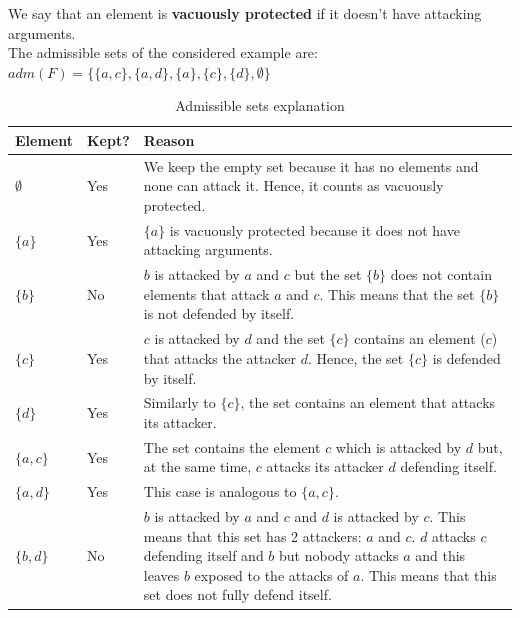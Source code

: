 \documentclass{scrbook}
\begin{document}
We say that an element is \textbf{vacuously protected} if it doesn't have attacking arguments. \\

The admissible sets of the considered example are: \\

$adm(F) = \{\{a,c\},\{a,d\},\{a\},\{c\},\{d\},\emptyset\}$ \\

\begin{table}
    \begin{tabularx}{\linewidth}{|p{5em}|p{4em}|X|} \hline
         \textbf{Element} & \textbf{Kept?} & \textbf{Reason} \\ \hline

        $\emptyset$ & Yes &
        We keep the empty set because it has no elements and none can attack it. Hence, it counts as vacuously protected. \\ \hline

        $\{a\}$ & Yes &
        $\{a\}$ is vacuously protected because it does not have attacking arguments. \\ \hline

        $\{b\}$ & No &
        $b$ is attacked by $a$ and $c$ but the set $\{b\}$ does not contain elements that attack $a$ and $c$. This means that the set $\{b\}$ is not defended by itself.\\ \hline

        $\{c\}$ & Yes &
        $c$ is attacked by $d$ and the set $\{c\}$ contains an element ($c$) that attacks the attacker $d$. Hence, the set $\{c\}$ is defended by itself.\\ \hline

        $\{d\}$ & Yes &
        Similarly to $\{c\}$, the set contains an element that attacks its attacker. \\ \hline

        $\{a,c\}$ & Yes &
        The set contains the element $c$ which is attacked by $d$ but, at the same time, $c$ attacks its attacker $d$ defending itself. \\ \hline

        $\{a,d\}$ & Yes &
        This case is analogous to $\{a,c\}$.\\ \hline

        $\{b,d\}$ & No &
        $b$ is attacked by $a$ and $c$ and $d$ is attacked by $c$. This means that this set has 2 attackers: $a$ and $c$. $d$ attacks $c$ defending itself and $b$ but nobody attacks $a$ and this leaves $b$ exposed to the attacks of $a$. This means that this set does not fully defend itself.\\ \hline
    \end{tabularx}
    \caption{Admissible sets explanation}
\end{table}
\end{document}

